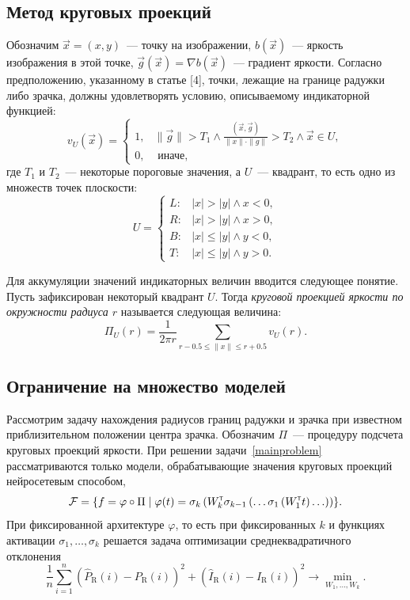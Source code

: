 \documentclass[12pt, twoside]{article}
\begin{document}
\subsection{Метод круговых проекций}
Обозначим $\vec{x} = (x, y)$~--- точку на изображении, $b(\vec{x})$~--- яркость изображения в этой точке, $\vec{g}(\vec{x}) = \nabla b(\vec{x})$~--- градиент яркости. Согласно предположению, указанному в статье [4], точки, лежащие на границе радужки либо зрачка, должны удовлетворять условию, описываемому индикаторной функцией:
\[
v_U(\vec{x}) = \begin{cases}1, & \parallel \vec{g} \parallel > T_1 \land \frac{(\vec{x}, \vec{g})}{\parallel x \parallel \cdot \parallel g \parallel} > T_2 \land \vec{x} \in U, \\ 0, & \text{ иначе,}\end{cases}
\]
где $T_1$ и $T_2$~--- некоторые пороговые значения, а $U$~--- квадрант, то есть одно из множеств точек плоскости:
\[
U = \begin{cases}L\!: & |x| > |y| \land x < 0, \\ R\!: & |x| > |y| \land x > 0, \\ B\!: & |x| \leqslant |y| \land y < 0, \\ T\!: & |x| \leqslant |y| \land y > 0.\end{cases}
\]

Для аккумуляции значений индикаторных величин вводится следующее понятие. Пусть зафиксирован некоторый квадрант $U$. Тогда \textit{круговой проекцией яркости по окружности радиуса $r$} называется следующая величина:
\[
\Pi_U(r) = \frac{1}{2\pi r} \sum_{r-0.5 \leqslant \parallel x \parallel \leqslant r + 0.5} v_U(r).
\]

\subsection{Ограничение на множество моделей}

Рассмотрим задачу нахождения радиусов границ радужки и зрачка при известном приблизительном положении центра зрачка. Обозначим $\Pi$~--- процедуру подсчета круговых проекций яркости. При решении задачи~\eqref{mainproblem} рассматриваются только модели, обрабатывающие значения круговых проекций нейросетевым способом,
\[
\mathcal{F} = \left\{f = \varphi \circ \Pi \mid \varphi(t) = \sigma_k\left(W_k^{\text{\tiny\sffamily\upshape\mdseries T}} \sigma_{k-1}\left(\ldots \sigma_1\left(W_1^{\text{\tiny\sffamily\upshape\mdseries T}} t\right)\ldots\right)\right)\right\}\!.
\]
При фиксированной архитектуре $\varphi$, то есть при фиксированных $k$ и функциях активации $\sigma_1, \ldots, \sigma_k$ решается задача оптимизации среднеквадратичного отклонения
\begin{equation}\label{secondproblem}
\frac{1}{n}\sum_{i=1}^n \left(\widehat{P}_\text{R}(i) - P_\text{R}(i)\right)^2 + \left(\widehat{I}_\text{R}(i) - I_\text{R}(i)\right)^2 \to \min_{W_1, \ldots, W_k}.
\end{equation}
\end{document}
